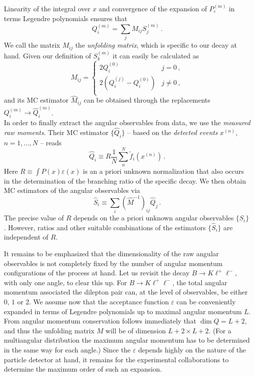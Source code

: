\documentclass[aps,prd,reprint,nofootinbib,preprintnumbers]{revtex4}
\newcommand{\est}[1]{\widehat{#1}}
\let\eps\varepsilon
\begin{document}
Linearity of the integral over $x$ and convergence of the expansion of $P_\eps^{(m)}$ in terms Legendre polynomials ensures that
\begin{equation}
    Q_i^{(m)} = \sum_j M_{ij} S_j^{(m)}\,.
\end{equation}
We call the matrix $M_{ij}$ the \emph{unfolding matrix}, which is specific to our decay at hand. Given our definition of
$S_k^{(m)}$ it can easily be calculated as
\begin{equation}
    M_{ij} = \begin{cases}
        2 Q_i^{(0)}                          & j = 0\,,\\
        2\left(Q_i^{(j)} - Q_i^{(0)}\right)  & j \neq 0\,,\\
    \end{cases}
\end{equation}
and its MC estimator $\est{M}_{ij}$  can be obtained through the replacements $Q_i^{(m)} \to \est{Q}_i^{(m)}$.\\

In order to finally extract the angular observables from data, we use the \emph{measured raw moments}. Their MC estimator
$\lbrace \est{Q}_i\rbrace$ -- based on the \emph{detected events} $x^{(n)}$, $n=1,\dots,N$ -- reads
\begin{equation}
    \est{Q}_i \equiv R \frac{1}{N} \sum_n^N \tilde{f}_i(x^{(n)})\,.
\end{equation}
Here $R \equiv \int P(x) \eps(x)$ is an a priori unknown normalization that also occurs in the determination of the branching
ratio of the specific decay. We then obtain MC estimators of the angular observables via
\begin{equation}
    \est{S}_i \equiv \sum_{i} \left(\hat{M}^{-1}\right)_{ij} \est{Q}_j\,.
\end{equation}
The precise value of $R$ depends on the a priori unknown angular observables $\lbrace S_i\rbrace$.
However, ratios and other suitable combinations of the estimators $\lbrace \est{S}_i\rbrace$ are independent
of $R$.

It remains to be emphasized that the dimensionality of the raw angular observables is not completely
fixed by the number of angular momentum configurations of the process at hand. Let us revisit the
decay $B\to K\ell^+\ell^-$, with only one angle,  to clear this up. For $B\to K\ell^+\ell^-$, the
total angular momentum associated the dilepton pair can, at the level of observables, be either $0$,
$1$ or $2$. We assume now that the acceptance function $\eps$ can be conveniently expanded in terms
of Legendre polynomials up to maximal angular momentum $L$. From angular momentum conservation
follows immediately that $\dim Q = L + 2$, and thus the unfolding matrix $M$ will be of
dimension $L + 2 \times L + 2$. (For a multiangular distribution the maximum angular momentum
has to be determined in the same way for each angle.)
Since the $\eps$ depends highly on the nature of the particle detector at hand, it remains for
the experimental collaborations to determine the maximum order of such an expansion.
\end{document}
